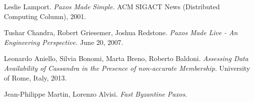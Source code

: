 \begin{thebibliography}{99}
   Leslie Lamport.
  	\newblock \textit{Paxos Made Simple.}
  	\newblock ACM SIGACT News (Distributed Computing Column), 2001.

   Tushar Chandra, Robert Griesemer, Joshua Redstone.
  	\newblock \textit{Paxos Made Live - An Engineering Perspective.}
  	\newblock June 20, 2007.

   Leonardo Aniello, Silvia Bonomi, Marta Breno, Roberto Baldoni.
    \newblock \textit{Assessing Data Availability of Cassandra in the Presence
of non-accurate Membership.}
	\newblock University of Rome, Italy, 2013.
  
   Jean-Philippe Martin, Lorenzo Alvisi.
    \newblock \textit{Fast Byzantine Paxos}.

\end{thebibliography}